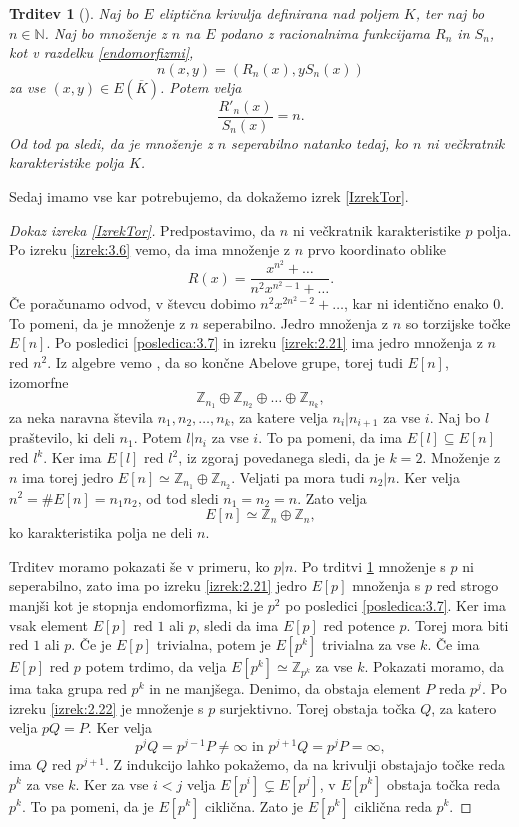 \documentclass[12pt,a4paper,twoside]{article}
\theoremstyle{definition} %
\theoremstyle{plain} %
\newtheorem{trditev}[definicija]{Trditev}
\numberwithin{equation}{section}  %
\newcommand{\N}{\mathbb N}
\newcommand{\Z}{\mathbb Z}
\newcommand{\E}[1]{E({#1})}
\begin{document}
\begin{trditev}[]
\label{trditev:2.28}
Naj bo $E$ eliptična krivulja definirana nad poljem $K$, ter naj bo $n\in \N$. Naj bo množenje z $n$ na $E$ podano z racionalnima funkcijama $R_n$ in $S_n$, kot v razdelku \ref{endomorfizmi},
$$n(x,y) = (R_n(x),yS_n(x))$$
za vse $(x,y) \in \E{\overline{K}}$. Potem velja
$$\frac{R'_n(x)}{S_n(x)} = n.$$
Od tod pa sledi, da je množenje z $n$ seperabilno natanko tedaj, ko $n$ ni večkratnik karakteristike polja $K$. 
\end{trditev}

Sedaj imamo vse kar potrebujemo, da dokažemo izrek \ref{IzrekTor}.

\begin{proof}[Dokaz izreka \ref{IzrekTor}]
Predpostavimo, da $n$ ni večkratnik karakteristike $p$ polja. Po izreku \ref{izrek:3.6} vemo, da ima množenje z $n$ prvo koordinato oblike
$$R(x) = \frac{x^{n^2}+\ldots}{n^2x^{n^2-1}+ \ldots}.$$
Če poračunamo odvod, v števcu dobimo $n^2x^{2n^2-2}+ \ldots$, kar ni identično enako $0$. To pomeni, da je množenje z $n$ seperabilno. Jedro množenja z $n$ so torzijske točke $E[n]$. Po posledici \ref{posledica:3.7} in izreku \ref{izrek:2.21} ima jedro množenja z $n$ red $n^2$. Iz algebre vemo \cite{predavanja}, da so končne Abelove grupe, torej tudi  $E[n]$, izomorfne
$$\Z_{n_1} \oplus \Z_{n_2} \oplus \ldots \oplus \Z_{n_k},$$
za neka naravna števila $n_1,n_2,\ldots,n_k$, za katere velja $n_i|n_{i+1}$  za vse $i$. Naj bo $l$ praštevilo, ki deli $n_1$. Potem $l|n_i$ za vse $i$. To pa pomeni, da ima $E[l] \subseteq E[n]$ red $l^k$. Ker ima $E[l]$ red $l^2$, iz zgoraj povedanega sledi, da je $k=2$. Množenje z $n$ ima torej jedro $E[n] \simeq \Z_{n_1} \oplus \Z_{n_2}$. Veljati pa mora tudi $n_2|n$. Ker velja $n^2=\#E[n] = n_1n_2$, od tod sledi $n_1=n_2=n$. Zato velja
$$E[n] \simeq \Z_n \oplus \Z_n,$$
ko karakteristika polja ne deli $n$.

Trditev moramo pokazati še v primeru, ko $p|n$. Po trditvi \ref{trditev:2.28} množenje s $p$ ni seperabilno, zato ima po izreku \ref{izrek:2.21} jedro $E[p]$ množenja s $p$ red strogo manjši kot je stopnja endomorfizma, ki je $p^2$ po posledici \ref{posledica:3.7}. Ker ima vsak element $E[p]$ red $1$ ali $p$, sledi da ima $E[p]$ red potence $p$. Torej mora biti red $1$ ali $p$. Če je $E[p]$ trivialna, potem je $E[p^k]$ trivialna za vse $k$. Če ima $E[p]$ red $p$ potem trdimo, da velja $E[p^k] \simeq \Z_{p ^k}$ za vse $k$. Pokazati moramo, da ima taka grupa red $p^k$ in ne manjšega. Denimo, da obstaja element $P$ reda $p^j$. Po izreku \ref{izrek:2.22} je množenje s $p$ surjektivno. Torej obstaja točka $Q$, za katero velja $pQ = P$. Ker velja
$$p^jQ = p^{j-1}P \neq \infty \text{ in } p^{j+1}Q = p^jP = \infty,$$
ima $Q$ red $p^{j+1}$. Z indukcijo lahko pokažemo, da na krivulji obstajajo točke reda $p^k$ za vse $k$.
Ker za vse $i < j$ velja $E[p^{i}] \subsetneq E[p^j]$, v $E[p^k]$ obstaja točka reda $p^k$. To pa pomeni, da je $E[p^k]$ ciklična. Zato je $E[p^k]$ ciklična reda $p^k$.


\end{proof}
\end{document}
